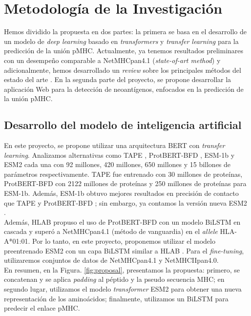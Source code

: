 \documentclass[a4paper]{article}
\begin{document}
\section{Metodología de la Investigación} 

Hemos dividido la propuesta en dos partes: la primera se basa en el desarrollo de un modelo de \textit{deep learning} basado en \textit{transformers} y \textit{transfer learning} para la predicción de la unión pMHC. Actualmente, ya tenemos resultados preliminares con un desempeño comparable a NetMHCpan4.1 (\textit{state-of-art method}) \citep{arceda2023neoantigen} y adicionalmente, hemos desarrollado un \textit{review} sobre los principales métodos del estado del arte \citep{machaca2023deep}. En la segunda parte del proyecto, se propone desarrollar la aplicación Web para la detección de neoantígenos, enfocados en la predicción de la unión pMHC.

\subsection{Desarrollo del modelo de inteligencia artificial}

En este proyecto, se propone utilizar una arquitectura BERT con \textit{transfer learning}. Analizamos alternativas como TAPE \citep{rao2019evaluating}, ProtBERT-BFD \citep{elnaggar2021prottrans}, ESM-1b \citep{rives2021biological} y ESM2 \citep{lin2023evolutionary} cada una con 92 millones, 420 millones, 650 millones y 15 billones de parámetros respectivamente. TAPE fue entrenado con 30 millones de proteínas, ProtBERT-BFD con 2122 millones de proteínas y 250 millones de proteínas para ESM-1b. Además, ESM-1b obtuvo mejores resultados en precisión de contacto que TAPE y ProtBERT-BFD \citep{rives2021biological}; sin embargo, ya contamos la versión nueva ESM2 \citep{lin2023evolutionary}.\\

Además, HLAB \citep{zhang2022hlab} propuso el uso de ProtBERT-BFD \citep{elnaggar2021prottrans} con un modelo BiLSTM en cascada y superó a NetMHCpan4.1 (método de vanguardia) en el \textit{allele} HLA-A*01:01. Por lo tanto, en este proyecto, proponemos utilizar el modelo preentrenado ESM2 \citep{lin2023evolutionary} con un capa BiLSTM  similar a HLAB \citep{zhang2022hlab}. Para el \textit{fine-tuning}, utilizaremos conjuntos de datos de NetMHCpan4.1 y NetMHCIIpan4.0.\\

En resumen, en la Figura. \ref{fig:proposal}, presentamos la propuesta: primero, se concatenan y se aplica \textit{padding} al péptido y la pseudo secuencia MHC; en segundo lugar, utilizamos el modelo \textit{transformer} ESM2 para obtener una nueva representación de los aminoácidos; finalmente, utilizamos un BiLSTM para predecir el enlace pMHC. 
\end{document}
